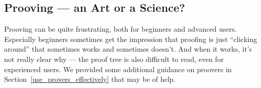 \subsection{Prooving --- an Art or a Science?}
\label{tut_proving_an_art_or_a_science}

Prooving can be quite frustrating, both for beginners and advanced users.  Especially beginners sometimes get the impression that proofing is just ``clicking around'' that sometimes works and sometimes doesn't.  And when it works, it's not really clear why --- the proof tree is also difficult to read, even for experienced users.  We provided some additional guidance on proovers in Section~\ref{use_provers_effectively} that may be of help.

